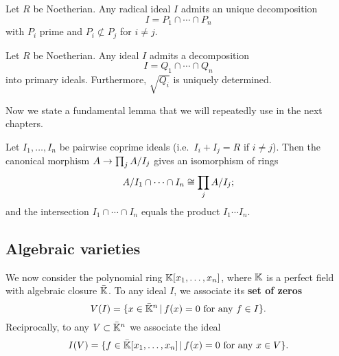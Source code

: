 \begin{proposition}
  Let $R$ be Noetherian. Any radical ideal $I$ admits an unique
  decomposition
  \begin{equation}
    \label{eq:213}
    I = P_1\cap\cdots\cap P_n
  \end{equation}
  with $P_i$ prime and $P_i\not\subset P_j$ for $i\ne j$.
\end{proposition}

\begin{theorem}
  Let $R$ be Noetherian. Any ideal $I$
  admits a decomposition
  \begin{equation}
    \label{eq:214}
    I = Q_1\cap\cdots\cap Q_n
  \end{equation}
  into primary ideals. Furthermore, $\sqrt{Q_i}$ is uniquely
  determined.
\end{theorem}

Now we state a fundamental lemma that we will repeatedly use in the
next chapters.

\begin{lemma}
  \label{th:chinese-remainder}
  Let $I_1,\ldots,I_n$ be pairwise coprime ideals (i.e.\ $I_i+I_j=R$ if
  $i\ne j$).  Then the canonical morphism $A\rightarrow\prod_j A/I_j$ gives an
  isomorphism of rings
  \begin{equation}
    \label{eq:211}
    A/I_1\cap\cdots\cap I_n \cong \prod_j A/I_j
    \text{;}
  \end{equation}
  and the intersection $I_1\cap\cdots\cap I_n$ equals the product
  $I_1\cdots I_n$.
\end{lemma}


\subsection{Algebraic varieties}
\label{sec:algebraic-varieties}
  We now consider the polynomial ring
$\mathbb{K}[x_1,\ldots,x_n]$, where $\mathbb{K}$ is a perfect field with algebraic
closure $\bar{\mathbb{K}}$. To any ideal $I$, we associate its \textbf{set of
  zeros}
\begin{equation}
  \label{eq:215}
  V(I) = \{x\in\bar{\mathbb{K}}^n \,|\, f(x) = 0 \text{ for any } f\in I\}
  \text{.}
\end{equation}
Reciprocally, to any $V\subset\bar{\mathbb{K}}^n$ we associate the ideal
\begin{equation}
  \label{eq:216}
  I(V) = \{f\in\bar{\mathbb{K}}[x_1,\ldots,x_n] \,|\, f(x) = 0 \text{ for any } x\in V\}
  \text{.}
\end{equation}

